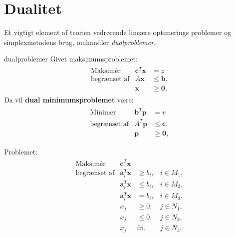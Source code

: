 \section{Dualitet}
%
Et vigtigt element af teorien vedrørende lineære optimerings problemer og simplexmetodens brug, omhandler \textit{dualproblemer}.
%
\begin{defn}{}{dualproblemer}
Givet maksimumsproblemet: 
%
\begin{align*}
\begin{array}{lrl}
\text{Maksimér}		&\textbf{c}^T\textbf{x}	& = z		\\
\text{begrænset af}	&A\textbf{x}	&\leq \mathbf{b},	\\
					&\mathbf{x}				&\geq \mathbf{0},
\end{array}
\end{align*}
%
Da vil \textbf{dual minimumsproblemet} være: \\
%
\begin{align*}
\begin{array}{lrl}
\text{Minimer}		&\textbf{b}^T\textbf{p}	& = v			\\
\text{begrænset af}	&A^T \textbf{p}	&\leq \mathbf{c},	\\
					&\mathbf{p}				&\geq \mathbf{0},
\end{array}
\end{align*}
%
\end{defn}
%
Problemet:
%
\begin{align*}
\begin{array}{lrll}
\text{Maksimér}		&\textbf{c}^T\textbf{x}	&			&\\
\text{begrænset af}	&\textbf{a}_i^T\textbf{x}	&\geq b_i,	&i \in M_1,\\
					&\textbf{a}_i^T\textbf{x}	&\leq b_i,	&i \in M_2,\\
					&\textbf{a}_i^T\textbf{x}	& = b_i,	&i \in M_3,\\
					&x_j					&\geq 0,	&j \in N_1,\\
					&x_j					&\leq 0,	&j \in N_2,\\							&x_j					&\text{fri},	&j \in N_3.
\end{array}
\end{align*}

